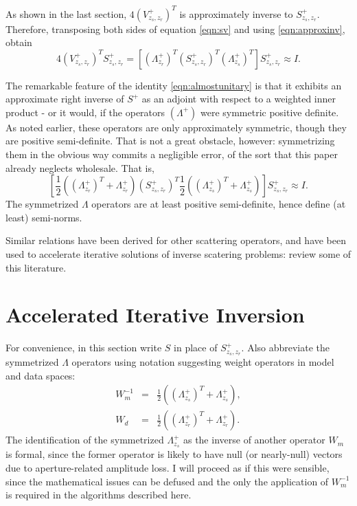 As shown in the last section, $4(V_{z_s,z_r}^+)^T$ is approximately
inverse to $S^{+}_{z_s,z_r}$. Therefore, transposing both sides of
equation \ref{eqn:sv} and using \ref{eqn:approxinv}, obtain
\begin{equation}
  \label{eqn:almostunitary}
  4(V_{z_s,z_r}^+)^TS^+_{z_s,z_r} = [ (\Lambda^+_{z_r})^T
  (S^{+}_{z_s,z_r})^T(\Lambda^+_{z_s})^T]S^{+}_{z_s,z_r} \approx I.
\end{equation}

The remarkable feature of the identity \ref{eqn:almostunitary} is that
it exhibits an approximate right inverse of $S^+$ as an adjoint with
respect to a weighted inner product - or it would, if the operators
$(\Lambda^+)$ were symmetric positive definite. As noted earlier,
these operators are only approximately symmetric, though they are
positive semi-definite. That is not a great obstacle, however:
symmetrizing them in the obvious way commits a negligible error, of
the sort that this paper already neglects wholesale. That is,
\begin{equation}
  \label{eqn:unitary}
  [ \frac{1}{2}((\Lambda^+_{z_r})^T+ \Lambda^+_{z_r})
  (S^{+}_{z_s,z_r})^T \frac{1}{2}((\Lambda^+_{z_s})^T+
  \Lambda^+_{z_s})]S^{+}_{z_s,z_r} \approx I.
\end{equation}
The symmetrized $\Lambda$ operators are at least positive
semi-definite, hence define (at least) semi-norms.

Similar relations have been derived for other scattering operators,
and have been used to accelerate iterative solutions of inverse
scatering problems: \cite{DafniSymes:SEG18b} review some of this
literature. 


\section{Accelerated Iterative Inversion}

For convenience, in this section write $S$ in place of
$S^+_{z_s,z_r}$. Also abbreviate the symmetrized $\Lambda$ operators
using notation suggesting weight
operators in model and data spaces:
\begin{eqnarray}
  W_m^{-1}&=& \frac{1}{2}((\Lambda^+_{z_s})^T+
              \Lambda^+_{z_s}),\nonumber \\
  W_d &=& \frac{1}{2}((\Lambda^+_{z_r})^T+ \Lambda^+_{z_r}).
          \label{eqn:wdef}
\end{eqnarray}
The identification of the symmetrized $\Lambda^+_{z_s}$ as the inverse
of another operator $W_m$ is formal, since the former operator is
likely to have null (or nearly-null) vectors due to aperture-related
amplitude loss. I will proceed as if this were sensible, since the
mathematical issues can be defused and the only the application of
$W_m^{-1}$ is required in the algorithms described here.

